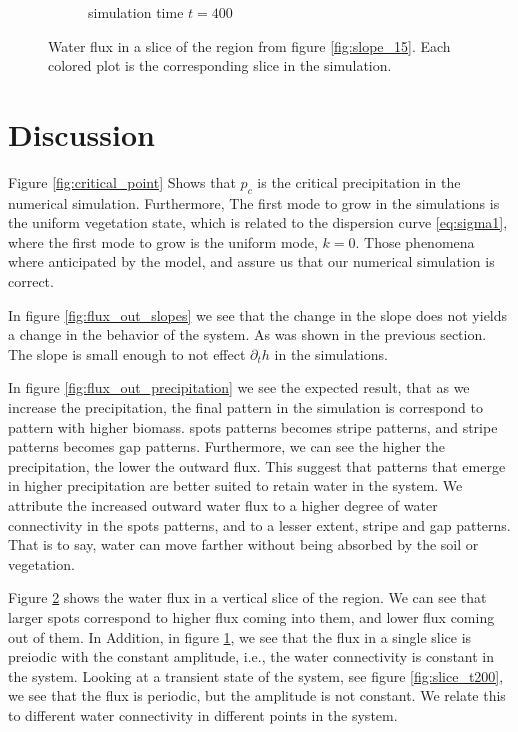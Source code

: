 \documentclass{article}
\numberwithin{equation}{section}
\begin{document}
\begin{figure}[ht!]
\begin{subfigure}{.4\linewidth}
        \caption{simulation time $t=400$}
        \label{fig:slice_t400}
    \end{subfigure}
    \caption{Water flux in a slice of the region from figure \ref{fig:slope_15}. Each colored plot is the corresponding slice in the simulation.}
    \label{fig:flux_slices}
\end{figure}

\section{Discussion}

Figure \ref{fig:critical_point} Shows that $p_c$ is the critical precipitation in the numerical simulation.
Furthermore, The first mode to grow in the simulations is the uniform vegetation state, which is related to the dispersion curve \ref{eq:sigma1}, where the first mode to grow is the uniform mode, $k=0$.
Those phenomena where anticipated by the model, and assure us that our numerical simulation is correct.

In figure \ref{fig:flux_out_slopes} we see that the change in the slope does not yields a change in the behavior of the system. As was shown in the previous section. The slope is small enough to not effect $\partial_t h$ in the simulations.

In figure \ref{fig:flux_out_precipitation} we see the expected result, that as we increase the precipitation, the final pattern in the simulation is correspond to pattern with higher biomass.
spots patterns becomes stripe patterns, and stripe patterns becomes gap patterns.
Furthermore, we can see the higher the precipitation, the lower the outward flux.
This suggest that patterns that emerge in higher precipitation are better suited to retain water in the system.
We attribute the increased outward water flux to a higher degree of water connectivity in the spots patterns, and to a lesser extent, stripe and gap patterns.
That is to say, water can move farther without being absorbed by the soil or vegetation.

Figure \ref{fig:flux_slices} shows the water flux in a vertical slice of the region. We can see that larger spots correspond to higher flux coming into them, and lower flux coming out of them. In Addition, in figure \ref{fig:slice_t400}, we see that the flux in a single slice is preiodic with the constant amplitude, i.e., the water connectivity is constant in the system. Looking at a transient state of the system, see figure \ref{fig:slice_t200}, we see that the flux is periodic, but the amplitude is not constant. We relate this to different water connectivity in different points in the system.
\end{document}
